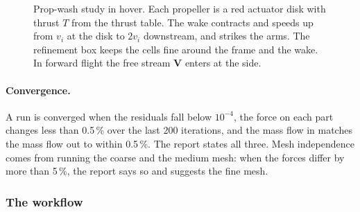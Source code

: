 \begin{figure}[ht]
\centering
{}
\caption{Prop-wash study in hover. Each propeller is a red actuator disk with thrust $T$ from the thrust
table. The wake contracts and speeds up from $v_i$ at the disk to $2v_i$ downstream, and strikes the arms. The
refinement box keeps the cells fine around the frame and the wake. In forward flight the free stream $\mathbf
V$ enters at the side.}
\label{fig:sim06-domain}
\end{figure}

\paragraph{Convergence.} A run is converged when the residuals fall below $10^{-4}$, the force on each part
changes less than 0.5\,\% over the last 200 iterations, and the mass flow in matches the mass flow out to
within 0.5\,\%. The report states all three. Mesh independence comes from running the coarse and the medium
mesh: when the forces differ by more than 5\,\%, the report says so and suggests the fine mesh.

\subsubsection*{The workflow}

